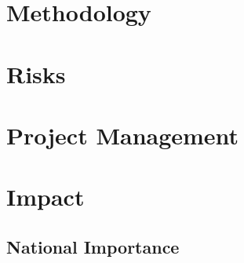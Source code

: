 \section{Methodology}
\label{sec:methodology}








\section{Risks}
\label{sec:risks}


% 


\section{Project Management}
\label{sec:project_management}


\section{Impact}
\label{sec:proposed_approach}


\subsection*{National Importance}
\label{sec:national_importance}

